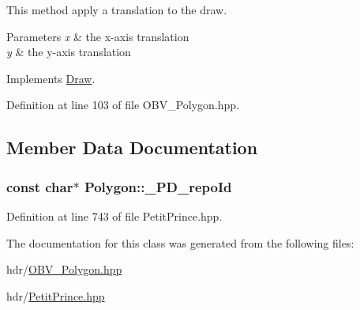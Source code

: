This method apply a translation to the draw. 


\begin{DoxyParams}{Parameters}
{\em x} & the x-\/axis translation \\
\hline
{\em y} & the y-\/axis translation \\
\hline
\end{DoxyParams}


Implements \hyperlink{class_draw_a71e63b40c9505098652a94e06872fdc6}{Draw}.



Definition at line 103 of file O\+B\+V\+\_\+\+Polygon.\+hpp.



\subsection{Member Data Documentation}
\subsubsection[{\texorpdfstring{\+\_\+\+P\+D\+\_\+repo\+Id}{_PD_repoId}}]{ const char$\ast$ Polygon\+::\+\_\+\+P\+D\+\_\+repo\+Id\hspace{0.3cm}{\ttfamily [static]}}\hypertarget{class_polygon_a3a8f0f25cfccaaf86f64f226442a6a08}{}\label{class_polygon_a3a8f0f25cfccaaf86f64f226442a6a08}


Definition at line 743 of file Petit\+Prince.\+hpp.



The documentation for this class was generated from the following files\+:\begin{DoxyCompactItemize}
\item 
hdr/\hyperlink{_o_b_v___polygon_8hpp}{O\+B\+V\+\_\+\+Polygon.\+hpp}\item 
hdr/\hyperlink{_petit_prince_8hpp}{Petit\+Prince.\+hpp}\end{DoxyCompactItemize}
